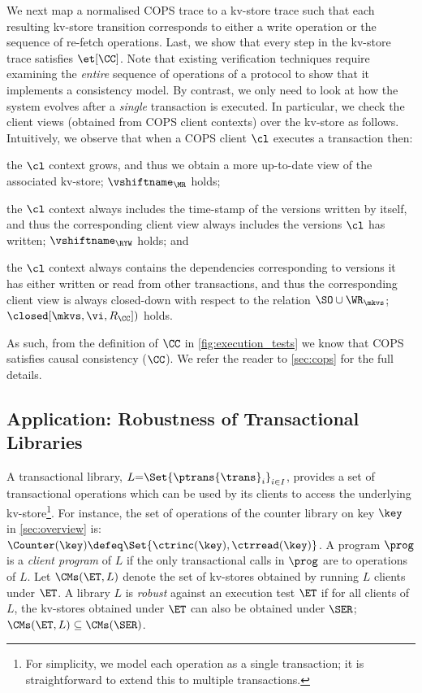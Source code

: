 We next map a normalised COPS trace to a kv-store trace such that each resulting 
kv-store transition corresponds 
to either a write operation or the sequence of re-fetch operations. 
Last, we show that every step in the kv-store trace satisfies \( \et[\CC] \).
Note that existing verification techniques \cite{framework-concur,seebelieve} require examining 
the \emph{entire} sequence of operations of a protocol to show that it implements a consistency model.
By contrast, we only need to look at how the system evolves after a \emph{single} transaction is executed.
In particular, we check the client views (obtained from COPS client contexts) over the kv-store as follows.
Intuitively, we observe that when a COPS client $\cl$ executes a transaction then:
\begin{enumerate*} 
\item the $\cl$ context grows, and thus we obtain a more up-to-date view of the associated kv-store; \ie $\vshiftname_{\MR}$ holds;
\item the $\cl$ context always includes the time-stamp of the versions written by itself, and thus the 
corresponding client view always includes the versions $\cl$ has written; \ie $\vshiftname_{\RYW}$ holds; and
\item the $\cl$ context always contains the dependencies corresponding to versions it has 
either written or read from other transactions, and thus the corresponding client view is always closed-down 
with respect to the relation $\SO \cup \WR_{\mkvs}$; \ie $\closed[\mkvs, \vi, R_{\CC}])$ holds.
\end{enumerate*}
As such, from the definition of $\CC$ in \cref{fig:execution_tests} we know that COPS satisfies causal consistency ($\CC$).
We refer the reader to \cref{sec:cops} for the full details.

\subsection{Application: Robustness of Transactional Libraries}
\label{sec:robustness}
A transactional library, $L {=} \Set{\ptrans{\trans}_{i}}_{i \in I}$,
provides a set of transactional operations which can be used by its clients to access the underlying
kv-store\footnote{For simplicity, we model each operation as a single transaction; it is straightforward to extend this to multiple transactions.}. 
For instance, the set of operations of the counter library on key $\key$ in \cref{sec:overview} is: $\Counter(\key) \defeq \Set{\ctrinc(\key), \ctrread(\key)}$.
A program $\prog$ is a \emph{client program} of $L$ if the only transactional calls in $\prog$ are to operations of $L$.  
Let $\CMs(\ET, L)$ denote the set of kv-stores obtained by running $L$ clients under $\ET$.
A library $L$ is \emph{robust} against an execution test
$\ET$ if for all clients of $L$, the kv-stores obtained under $\ET$ can also be obtained under $\SER$; 
\ie $\CMs(\ET, L) \subseteq \CMs(\SER)$.




